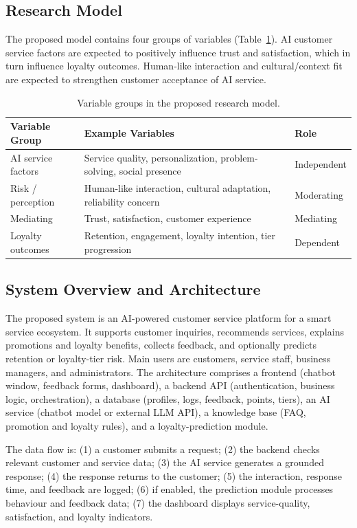 \documentclass[runningheads]{llncs}
\begin{document}
\subsection{Research Model}
The proposed model contains four groups of variables (Table~\ref{tab:model}). AI customer service factors are expected to positively influence trust and satisfaction, which in turn influence loyalty outcomes. Human-like interaction and cultural/context fit are expected to strengthen customer acceptance of AI service.

\begin{table}[t]
\caption{Variable groups in the proposed research model.}\label{tab:model}
\centering
\begin{tabular}{@{}lll@{}}
\toprule
Variable Group & Example Variables & Role \\
\midrule
AI service factors & Service quality, personalization, problem-solving, social presence & Independent \\
Risk / perception & Human-like interaction, cultural adaptation, reliability concern & Moderating \\
Mediating & Trust, satisfaction, customer experience & Mediating \\
Loyalty outcomes & Retention, engagement, loyalty intention, tier progression & Dependent \\
\bottomrule
\end{tabular}
\end{table}

\subsection{System Overview and Architecture}
The proposed system is an AI-powered customer service platform for a smart service ecosystem. It supports customer inquiries, recommends services, explains promotions and loyalty benefits, collects feedback, and optionally predicts retention or loyalty-tier risk. Main users are customers, service staff, business managers, and administrators. The architecture comprises a frontend (chatbot window, feedback forms, dashboard), a backend API (authentication, business logic, orchestration), a database (profiles, logs, feedback, points, tiers), an AI service (chatbot model or external LLM API), a knowledge base (FAQ, promotion and loyalty rules), and a loyalty-prediction module.

The data flow is: (1) a customer submits a request; (2) the backend checks relevant customer and service data; (3) the AI service generates a grounded response; (4) the response returns to the customer; (5) the interaction, response time, and feedback are logged; (6) if enabled, the prediction module processes behaviour and feedback data; (7) the dashboard displays service-quality, satisfaction, and loyalty indicators.
\end{document}
